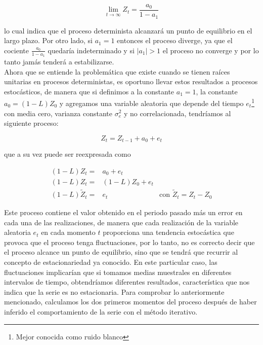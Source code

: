\begin{equation}
\lim_{t\rightarrow \infty } Z_t=\frac{a_0}{1-a_1}
\end{equation}   

lo cual  indica que el proceso determinista alcanzará un punto de equilibrio en el largo plazo. Por otro lado, si $a_1=1$ entonces el proceso diverge, ya que el cociente $\frac{a_0}{1-a_1}$ quedaría indeterminado y si  $\left | a_1 \right |>1$ el proceso no converge y por lo tanto jamás tenderá a estabilizarse.\\

Ahora que se entiende la problemática que existe cuando se tienen raíces unitarias en procesos deterministas, es oportuno llevar estos resultados a procesos estocásticos, de manera que si definimos a la constante $a_1=1$, la constante $a_0=(1-L)Z_0$ y agregamos una variable aleatoria que depende del tiempo $e_t$\footnote{ Mejor conocida como ruido blanco} con media cero, varianza constante $\sigma_e^2$ y no correlacionada, tendríamos al siguiente proceso:

\begin{equation}
Z_t= Z_{t-1} + a_0 + e_t
\end{equation} 

que a su vez puede ser reexpresada como

\begin{eqnarray}\label{eq:AR1} 
(1-L)Z_t =& a_0 + e_t & \nonumber \\
(1-L)Z_t =& (1-L)Z_0 + e_t & \nonumber \\
(1-L)\tilde{Z}_t =& e_t & \mbox{con $\tilde{Z}_t =Z_t-Z_0$}
\end{eqnarray}
 

Este proceso contiene el valor obtenido en el periodo pasado más un error en cada una de las realizaciones, de manera que cada realización de la variable aleatoria ${e_t}$ en cada momento $t$ proporciona una tendencia estocástica que provoca que el proceso tenga fluctuaciones, por lo tanto, no es correcto decir que el proceso alcance un punto de equilibrio, sino que se tendrá que recurrir al concepto de estacionariedad ya conocido. En este particular caso, las fluctuaciones implicarían que si tomamos medias muestrales en diferentes intervalos de tiempo, obtendríamos diferentes resultados, característica  que nos indica que la serie es no estacionaria. Para comprobar lo anteriormente mencionado, calculamos los dos primeros momentos del proceso después de haber inferido el comportamiento de la serie con el m\'etodo iterativo.

